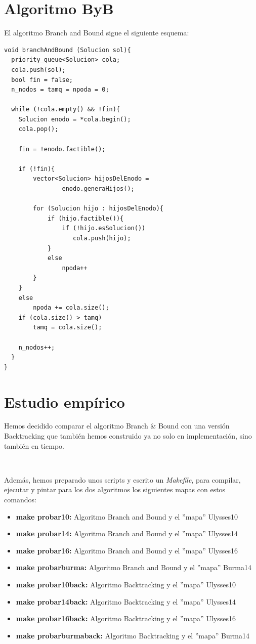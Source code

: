 \documentclass{article}
\begin{document}
	\section{Algoritmo ByB}
	El algoritmo Branch and Bound sigue el siguiente esquema:
	
	\begin{lstlisting}
void branchAndBound (Solucion sol){
  priority_queue<Solucion> cola;
  cola.push(sol);
  bool fin = false;
  n_nodos = tamq = npoda = 0;

  while (!cola.empty() && !fin){
	Solucion enodo = *cola.begin();
	cola.pop();

	fin = !enodo.factible();

	if (!fin){
		vector<Solucion> hijosDelEnodo = 
				enodo.generaHijos();

		for (Solucion hijo : hijosDelEnodo){
			if (hijo.factible()){
				if (!hijo.esSolucion())
				   cola.push(hijo);
			}
			else
				npoda++
		}
	}
	else
		npoda += cola.size();
	if (cola.size() > tamq)
		tamq = cola.size();
		
	n_nodos++;
  }
}
	\end{lstlisting}
	
	\section{Estudio empírico}
	Hemos decidido comparar el algoritmo Branch \& Bound con una versión Backtracking que también hemos construido ya no solo en implementación, sino también en tiempo. 
	
	\
	
	Además, hemos preparado unos scripts y escrito un \textit{Makefile}, para compilar, ejecutar y pintar para los dos algoritmos los siguientes mapas con estos comandos:
	
	\begin{itemize}
		\item \textbf{make probar10:} Algoritmo Branch and Bound y el ''mapa'' Ulysses10
		\item \textbf{make probar14:} Algoritmo Branch and Bound y el ''mapa'' Ulysses14
		\item \textbf{make probar16:} Algoritmo Branch and Bound y el ''mapa'' Ulysses16
		\item \textbf{make probarburma:} Algoritmo Branch and Bound y el ''mapa'' Burma14
		\item \textbf{make probar10back:} Algoritmo Backtracking y el ''mapa'' Ulysses10
		\item \textbf{make probar14back:} Algoritmo Backtracking y el ''mapa'' Ulysses14
		\item \textbf{make probar16back:} Algoritmo Backtracking y el ''mapa'' Ulysses16
		\item \textbf{make probarburmaback:} Algoritmo Backtracking y el ''mapa'' Burma14
	\end{itemize}
	
\end{document}
